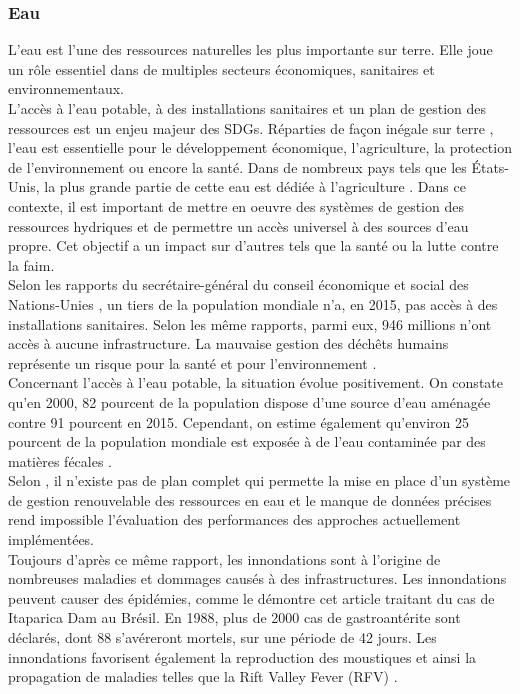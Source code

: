 \documentclass[10pt, conference, compsocconf]{llncs}
\begin{document}
		\subsubsection{Eau}
			L'eau est l'une des ressources naturelles les plus importante sur terre. Elle joue un rôle essentiel dans de multiples secteurs économiques, sanitaires et environnementaux.\\
			L'accès à l'eau potable, à des installations sanitaires et un plan de gestion des ressources est un enjeu majeur des SDGs. Réparties de façon inégale sur terre \cite{lefevre_repartition_nodate}, l'eau est essentielle pour le développement économique, l'agriculture, la protection de l'environnement ou encore la santé. Dans de nombreux pays tels que les États-Unis, la plus grande partie de cette eau est dédiée à l'agriculture \cite{world_business_council_for_sustainable_development_global_nodate}. Dans ce contexte, il est important de mettre en oeuvre des systèmes de gestion des ressources hydriques et de permettre un accès universel à des sources d'eau propre. Cet objectif a un impact sur d'autres tels que la santé ou la lutte contre la faim.\\
			Selon les rapports du secrétaire-général du conseil économique et social des Nations-Unies \cite{united_nations_economic_and_social_council_progress_2017}\cite{united_nations_economic_and_social_council_progress_2017-1}, un tiers de la population mondiale n'a, en 2015, pas accès à des installations sanitaires. Selon les même rapports, parmi eux, 946 millions n'ont accès à aucune infrastructure. La mauvaise gestion des déchêts humains représente un risque pour la santé et pour l'environnement \cite{ashbolt_microbial_2004}.\\
			Concernant l'accès à l'eau potable, la situation évolue positivement. On constate qu'en 2000, 82 pourcent de la population dispose d'une source d'eau aménagée contre 91 pourcent en 2015. Cependant, on estime également qu'environ 25 pourcent de la population mondiale est exposée à de l'eau contaminée par des matières fécales \cite{united_nations_goal_nodate-4}. \\
			Selon \cite{rana_water_2017}, il n'existe pas de plan complet qui permette la mise en place d'un système de gestion renouvelable des ressources en eau et le manque de données précises rend impossible l'évaluation des performances des approches actuellement implémentées. \\
			Toujours d'après ce même rapport, les innondations sont à l'origine de nombreuses maladies et dommages causés à des infrastructures. Les innondations peuvent causer des épidémies, comme le démontre cet article \cite{texeira_gastroenteritis_1993} traitant du cas de Itaparica Dam au Brésil. En 1988, plus de 2000 cas de gastroantérite sont déclarés, dont 88 s'avéreront mortels, sur une période de 42 jours. Les innondations favorisent également la reproduction des moustiques et ainsi la propagation de maladies telles que la Rift Valley Fever (RFV) \cite{hanafi_rift_2010}.\\
\end{document}
